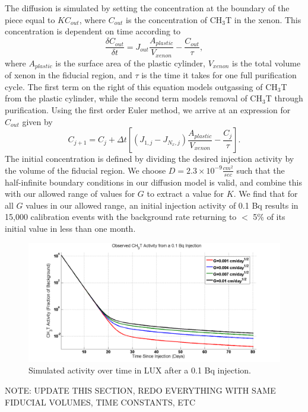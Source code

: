 The diffusion is simulated by setting the concentration at the boundary of the piece equal to $KC_{out}$, where $C_{out}$ is the concentration of CH$_3$T in the xenon.  This concentration is dependent on time according to
\[\frac{\delta C_{out}}{\delta t} = J_{out} \frac{A_{plastic}}{V_{xenon}}-\frac{C_{out}}{\tau},\]
where $A_{plastic}$ is the surface area of the plastic cylinder, $V_{xenon}$ is the total volume of xenon in the fiducial region, and $\tau$ is the time it takes for one full purification cycle.  The first term on the right of this equation models outgassing of CH$_3$T from the plastic cylinder, while the second term models removal of CH$_3$T through purification.  Using the first order Euler method, we arrive at an expression for $C_{out}$ given by
\[C_{j+1}=C_j + \Delta t [(J_{1,j}-J_{N_x,j})\frac{A_{plastic}}{V_{xenon}}-\frac{C_j}{\tau}].\]
The initial concentration is defined by dividing the desired injection activity by the volume of the fiducial region.  We choose $D = 2.3 \times 10^{-9} \frac {cm^2}{sec}$ such that the half-infinite boundary conditions in our diffusion model is valid, and combine this with our allowed range of values for $G$ to extract a value for $K$.  We find that for all $G$ values in our allowed range, an initial injection activity of 0.1 Bq results in 15,000 calibration events with the background rate returning to $<$ 5\% of its initial value in less than one month. 

\begin{figure}[H]
\centering
\includegraphics[scale=0.15]{LUXActivityOverTime.png}
\caption{Simulated activity over time in LUX after a 0.1 Bq injection.}
\label{fig:LUXActivity}
\end{figure}

NOTE: UPDATE THIS SECTION, REDO EVERYTHING WITH SAME FIDUCIAL VOLUMES, TIME CONSTANTS, ETC
